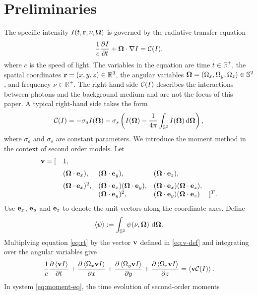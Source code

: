 
\section{Preliminaries}\label{sec:preliminary}
The specific intensity $I(t,\mathbf{r},\nu,\boldsymbol{\Omega})$ is governed by the
radiative transfer equation
\begin{equation}\label{eq:rt}
  \dfrac{1}{c}\pd{I}{t}+\bOmega\cdot\nabla I
  = \cC(I),   
\end{equation}
where $c$ is the speed of light. The variables in the equation are
time $t \in \mathbb{R}^+$, the spatial coordinates
$\mathbf{r} = (x, y, z)\in \mathbb{R}^3$, the angular variables $\boldsymbol{\Omega} = \left(
\Omega_x, \Omega_y, \Omega_z \right) \in \mathbb{S}^2$,
and frequency $\nu\in\mathbb{R}^+$. The right-hand side
${\mathcal C}(I)$ describes the interactions between photons and the background medium
and are not the focus of this paper. A typical right-hand side takes the form 
\[
  {\mathcal C}(I) = -\sigma_a I(\boldsymbol{\Omega}) - \sigma_s
  \left(I(\boldsymbol{\Omega}) - \frac1{4\pi}\int_{\mathbb{S}^2} I(\boldsymbol{\Omega})
  \,{\rm d}\boldsymbol{\Omega} \right),
\]
where $\sigma_a$ and $\sigma_s$ are constant parameters. 
We introduce the moment method in the context of second order models. Let
\begin{equation}\label{eq:v-def}
\begin{array}{rllll}
  \bv = [ &1, &&& \\ [2mm]
  & (\bOmega\cdot\be_x), & (\bOmega\cdot\be_y), & (\bOmega\cdot\be_z),
  &\\ [2mm]
  & (\bOmega\cdot\be_x)^2,&(\bOmega\cdot\be_x)(\bOmega\cdot\be_y),
  &(\bOmega\cdot\be_x)(\bOmega\cdot\be_z), & \\
  && (\bOmega\cdot\be_y)^2,&(\bOmega\cdot\be_y)(\bOmega\cdot\be_z) &]^T.
\end{array}
\end{equation}
Use $\mathbf{e}_x$, $\mathbf{e}_y$ and $\mathbf{e}_z$ to denote the unit vectors along the
coordinate axes. Define
$$
\left\langle  \psi  \right\rangle := \int_{\mathbb{S}^2} \psi(\nu, \boldsymbol{\Omega})\, \,{\rm d}\boldsymbol{\Omega}.
$$
Multiplying equation \eqref{eq:rt} by the vector $\mathbf{v}$ defined in \eqref{eq:v-def}
and integrating over the angular variables give
\begin{equation}\label{eq:moment-eq}
  \dfrac{1}{c}\pd{\left\langle \bv I\right\rangle}{t}
  + \pd{\Vint{\Omega_x \bv I}}{x} + \pd{\Vint{\Omega_y \bv I}}{y}
  + \pd{\Vint{\Omega_z \bv I}}{z}
  = \left\langle\bv \mathcal{C}(I)\right\rangle.
\end{equation}
In system \eqref{eq:moment-eq}, the time evolution of second-order moments
